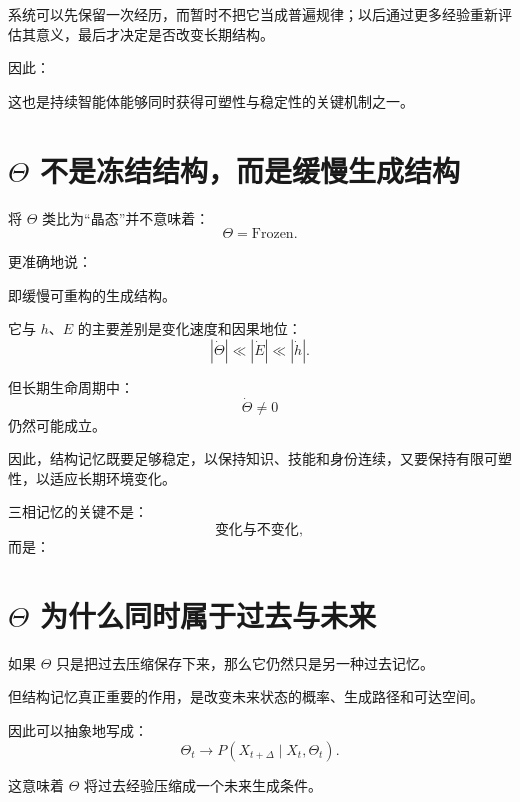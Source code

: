 系统可以先保留一次经历，而暂时不把它当成普遍规律；以后通过更多经验重新评估其意义，最后才决定是否改变长期结构。

因此：
\begin{statementbox}
\centering
{}
\end{statementbox}

这也是持续智能体能够同时获得可塑性与稳定性的关键机制之一。

\section{$\Theta$ 不是冻结结构，而是缓慢生成结构}

将 $\Theta$ 类比为“晶态”并不意味着：
\[
\Theta=\text{Frozen}.
\]

更准确地说：
\begin{statementbox}
\centering
{}
\end{statementbox}

即缓慢可重构的生成结构。

它与 $h$、$E$ 的主要差别是变化速度和因果地位：
\[
|\dot\Theta|
\ll
|\dot E|
\ll
|\dot h|.
\]

但长期生命周期中：
\[
\dot\Theta\neq0
\]
仍然可能成立。

因此，结构记忆既要足够稳定，以保持知识、技能和身份连续，又要保持有限可塑性，以适应长期环境变化。

三相记忆的关键不是：
\[
\text{变化与不变化},
\]
而是：
\begin{statementbox}
\centering
{}
\end{statementbox}

\section{$\Theta$ 为什么同时属于过去与未来}

如果 $\Theta$ 只是把过去压缩保存下来，那么它仍然只是另一种过去记忆。

但结构记忆真正重要的作用，是改变未来状态的概率、生成路径和可达空间。

因此可以抽象地写成：
\[
\boxed{
\Theta_t
\rightarrow
P(X_{t+\Delta}\mid X_t,\Theta_t).
}
\]

这意味着 $\Theta$ 将过去经验压缩成一个未来生成条件。

